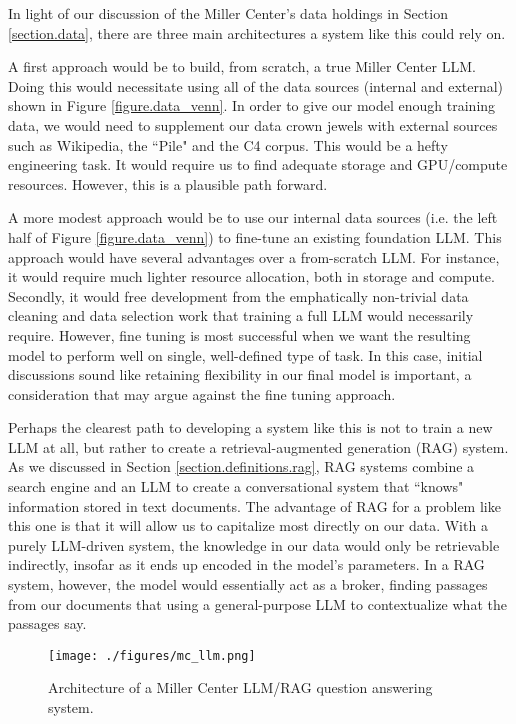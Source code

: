 \documentclass[12pt, oneside]{article}   	%
\begin{document}
In light of our discussion of the Miller Center's data holdings in Section \ref{section.data}, there are three main architectures a system like this could rely on.

A first approach would be to build, from scratch, a true Miller Center LLM.  Doing this would necessitate using all of the data sources (internal and external) shown in Figure \ref{figure.data_venn}.  In order to give our model enough training data, we would need to supplement our data crown jewels with external sources such as Wikipedia, the ``Pile" and the C4 corpus.  This would be a hefty engineering task.  It would require us to find adequate storage and GPU/compute resources.  However, this is a plausible path forward.

A more modest approach would be to use our internal data sources (i.e. the left half of Figure \ref{figure.data_venn}) to fine-tune an existing foundation LLM.  This approach would have several advantages over a from-scratch LLM.  For instance, it would require much lighter resource allocation, both in storage and compute.  Secondly, it would free development from the emphatically non-trivial data cleaning and data selection work that training a full LLM would necessarily require.  However, fine tuning is most successful when we want the resulting model to perform well on single, well-defined type of task.  In this case, initial discussions sound like retaining flexibility in our final model is important, a consideration that may argue against the fine tuning approach.

Perhaps the clearest path  to developing a system like this is not to train a new LLM at all, but rather to create a retrieval-augmented generation (RAG) system.  As we discussed in Section \ref{section.definitions.rag}, RAG systems combine a search engine and an LLM to create a conversational system that ``knows" information stored in text documents.  The advantage of RAG for a problem like this one is that it will allow us to capitalize most directly on our data.  With a purely LLM-driven system, the knowledge in our data would only be retrievable indirectly, insofar as it ends up encoded in the model's parameters.  In a RAG system, however, the model would essentially act as a broker, finding passages from our documents that using a general-purpose LLM to contextualize what the passages say.


\begin{figure}[htbp]
\begin{center}
\texttt{[image: ./figures/mc\_llm.png]}
\caption{Architecture of a Miller Center LLM/RAG question answering system.}
\label{figure.mcllm}
\end{center}
\end{figure}
\end{document}
